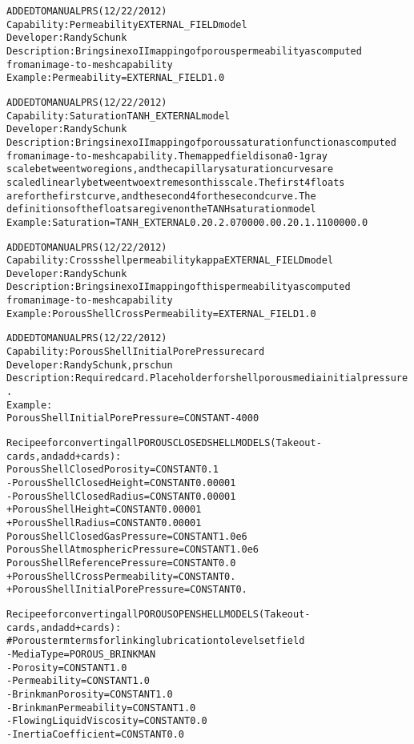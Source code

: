 \documentclass{article}
\begin{document}
\begin{alltt}
ADDED TO MANUAL PRS (12/22/2012)
Capability:  Permeability  EXTERNAL_FIELD model
Developer: Randy Schunk
Description:  Brings in exoII mapping of porous permeability as computed
from an image-to-mesh capability
Example: Permeability   = EXTERNAL_FIELD {1.0}

ADDED TO MANUAL PRS (12/22/2012)
Capability:  Saturation TANH_EXTERNAL model
Developer: Randy Schunk
Description:  Brings in exoII mapping of porous saturation function as computed
from an image-to-mesh capability. The mapped field is on a 0-1 gray
scale between two regions, and the capillary saturation curves are
scaled linearly between two extremes on this scale. The first 4 floats
are for the first curve, and the second 4 for the second curve.  The
definitions of the floats are given on the TANH saturation model 
Example: Saturation = TANH_EXTERNAL 0.2 0. 2.0 70000.0 0.2 0. 1.1 100000.0


ADDED TO MANUAL PRS (12/22/2012)
Capability:  Cross shell permeability kappa EXTERNAL_FIELD model
Developer: Randy Schunk
Description:  Brings in exoII mapping of this permeability as computed
from an image-to-mesh capability
Example: Porous Shell Cross Permeability   = EXTERNAL_FIELD {1.0}

ADDED TO MANUAL PRS (12/22/2012)
Capability:  Porous Shell Initial Pore Pressure  card
Developer: Randy Schunk, prschun
Description: Required card. Place holder for shell porous media initial pressure.  
Example: 
Porous Shell Initial Pore Pressure = CONSTANT -4000


Recipee for converting all POROUS CLOSED SHELL MODELS (Take out -
 cards, and add + cards):
 Porous Shell Closed Porosity      = CONSTANT 0.1
-Porous Shell Closed Height        = CONSTANT 0.00001
-Porous Shell Closed Radius        = CONSTANT 0.00001
+Porous Shell Height               = CONSTANT 0.00001
+Porous Shell Radius               = CONSTANT 0.00001
 Porous Shell Closed Gas Pressure  = CONSTANT 1.0e6
 Porous Shell Atmospheric Pressure = CONSTANT 1.0e6
 Porous Shell Reference Pressure   = CONSTANT 0.0
+Porous Shell Cross Permeability = CONSTANT {0.}
+Porous Shell Initial Pore Pressure = CONSTANT 0.


Recipee for converting all POROUS OPEN SHELL MODELS  (Take out -
 cards, and add + cards):
 # Porous term terms for linking lubrication to level set field
-Media Type                        = POROUS_BRINKMAN
-Porosity                           = CONSTANT 1.0
-Permeability                              = CONSTANT 1.0
-Brinkman Porosity                  = CONSTANT 1.0
-Brinkman Permeability              = CONSTANT 1.0
-FlowingLiquid Viscosity            = CONSTANT 0.0
-Inertia Coefficient                = CONSTANT 0.0


\end{alltt}
\end{document}
